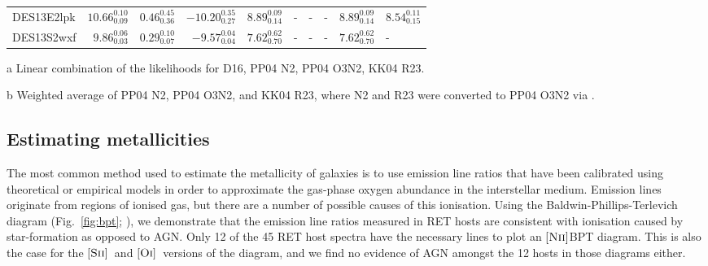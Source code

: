 \documentclass[fleqn,usenatbib,]{mnras}
\newcommand{\OI}[0]{$[\textnormal{\textsc{Oi}}]$}
\newcommand{\SII}[0]{$[\textnormal{\textsc{Sii}}]$}
\newcommand{\NII}[0]{$[\textnormal{\textsc{Nii}}]$}
\begin{document}
\begin{table}
\begin{threeparttable}
\begin{tabular}{lrrrllllll}
DES13E2lpk  &  $10.66 _{\scriptscriptstyle 0.09} ^{\scriptscriptstyle 0.10}$ &   $0.46 _{\scriptscriptstyle 0.36} ^{\scriptscriptstyle 0.45}$ &  $-10.20 _{\scriptscriptstyle 0.27} ^{\scriptscriptstyle 0.35}$ &  $8.89 _{\scriptscriptstyle 0.14} ^{\scriptscriptstyle 0.09}$ &                                                             - &                                                             - &                                                             - &  $8.89 _{\scriptscriptstyle 0.14} ^{\scriptscriptstyle 0.09}$ &  $8.54 _{\scriptscriptstyle 0.15} ^{\scriptscriptstyle 0.11}$ \\
DES13S2wxf  &   $9.86 _{\scriptscriptstyle 0.03} ^{\scriptscriptstyle 0.06}$ &   $0.29 _{\scriptscriptstyle 0.07} ^{\scriptscriptstyle 0.10}$ &   $-9.57 _{\scriptscriptstyle 0.04} ^{\scriptscriptstyle 0.04}$ &  $7.62 _{\scriptscriptstyle 0.70} ^{\scriptscriptstyle 0.62}$ &                                                             - &                                                             - &                                                             - &  $7.62 _{\scriptscriptstyle 0.70} ^{\scriptscriptstyle 0.62}$ &                                                             - \\
\bottomrule
\end{tabular}
\begin{tablenotes}
\item[a] Linear combination of the likelihoods for D16, PP04 N2, PP04 O3N2, KK04 R23.
\item[b] Weighted average of PP04 N2, PP04 O3N2, and KK04 R23, where N2 and R23 were converted to PP04 O3N2 via \citet{Kewley2008}.

\end{tablenotes}
\end{threeparttable}
\label{tab:derived}
\end{table}

\subsection{Estimating metallicities \label{subsec:calc_Z}}

The most common method used to estimate the metallicity of galaxies is to use emission line ratios that have been calibrated using theoretical or empirical models in order to approximate the gas-phase oxygen abundance in the interstellar medium. Emission lines originate from regions of ionised gas, but there are a number of possible causes of this ionisation. Using the Baldwin-Phillips-Terlevich diagram (Fig.~\ref{fig:bpt}; \citealt{Baldwin1981}), we demonstrate that the emission line ratios measured in RET hosts are consistent with ionisation caused by star-formation as opposed to AGN. Only 12 of the 45 RET host spectra have the necessary lines to plot an \NII BPT diagram. This is also the case for the \SII~and \OI~versions of the diagram, and we find no evidence of AGN amongst the 12 hosts in those diagrams either.
\end{document}
